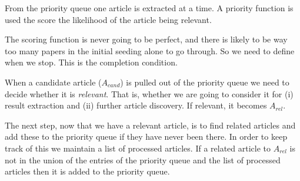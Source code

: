 \documentclass[a4paper, oneside]{memoir}
\begin{document}
From the priority queue one article is extracted at a time. A priority function is used the score the likelihood of the article being relevant.

The scoring function is never going to be perfect, and there is likely to be way too many papers in the initial seeding alone to go through. So we need to define when we stop. This is the completion condition.

When a candidate article ($A_{cand}$) is pulled out of the priority queue we need to decide whether it is \textsl{relevant}. That is, whether we are going to consider it for (i) result extraction and (ii) further article discovery. If relevant, it becomes $A_{rel}$.

The next step, now that we have a relevant article, is to find related articles and add these to the priority queue if they have never been there. In order to keep track of this we maintain a list of processed articles. If a related article to $A_{rel}$ is not in the union of the entries of the priority queue and the list of processed articles then it is added to the priority queue.
\end{document}
